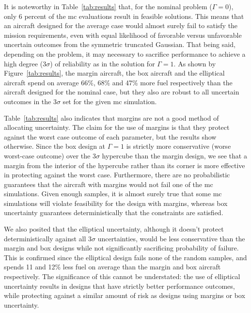 It is noteworthy in Table~\ref{tab:results} that, for the nominal problem ($\Gamma = 0$),
only 6 percent of the \gls{mc} evaluations result in feasible solutions.
This means that an aircraft designed for the average case would almost surely
fail to satisfy the mission requirements, even with equal likelihood of favorable versus
unfavorable uncertain outcomes from the symmetric truncated Gaussian.
That being said, depending on the problem, it may necessary to sacrifice
performance to achieve a high degree ($3\sigma$) of
reliability as in the solution for $\Gamma = 1$. As shown by Figure~\ref{tab:results}, the margin aircraft, the box aircraft
and the elliptical aircraft spend on average 66\%, 68\% and 47\% more fuel respectively
than the aircraft designed for the nominal case, but they also are
robust to all uncertain outcomes in the $3\sigma$ set for the given \gls{mc} simulation.

Table~\ref{tab:results} also indicates that margins are not a good method of
allocating uncertainty. The claim for the use of margins is that they protect against
the worst case outcome of each parameter, but the results show otherwise.
Since the box design at $\Gamma=1$ is strictly
more conservative (worse worst-case outcome) over the $3\sigma$ hypercube
than the margin design, we see that a margin from the interior of the hypercube
rather than its corner is more effective in protecting against the worst case.
Furthermore, there are no probabilistic
guarantees that the aircraft
with margins would not fail one of the \gls{mc} simulations. Given enough samples,
it is almost surely true that some \gls{mc} simulations will violate feasibility
for the design with margins,
whereas box uncertainty guarantees deterministically that the constraints are satisfied.

We also posited that the elliptical uncertainty, although it doesn't
protect deterministically against all $3\sigma$ uncertainties, would be less conservative than the
margin and box designs while not significantly sacrificing probability of failure. This is
confirmed since the elliptical design fails none of the random samples,
and spends 11 and 12\% less fuel on average
than the margin and box aircraft respectively.
The significance of this cannot be understated: the use of elliptical uncertainty
results in designs that have strictly better performance outcomes, while protecting
against a similar amount of risk as designs using margins or box uncertainty.

